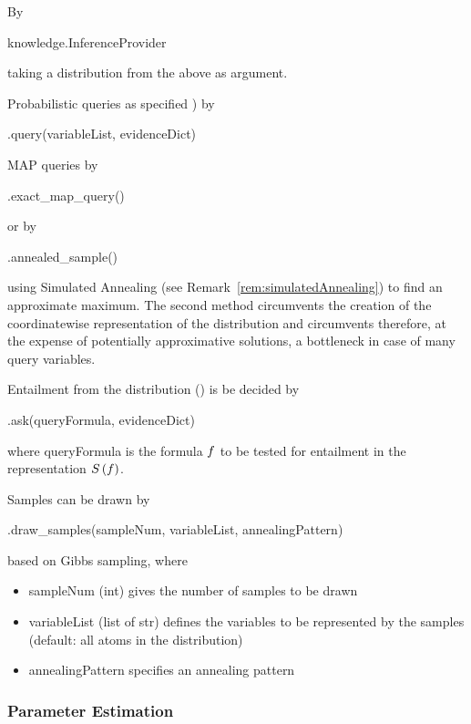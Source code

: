 By
\begin{centeredcode}
	knowledge.InferenceProvider
\end{centeredcode}
taking a distribution from the above as argument.

Probabilistic queries as specified )  by
\begin{centeredcode}
	.query(variableList, evidenceDict)
\end{centeredcode}

MAP queries by
\begin{centeredcode}
	.exact\_map\_query()
\end{centeredcode}
or by
\begin{centeredcode}
	.annealed\_sample()
\end{centeredcode}
using Simulated Annealing (see Remark~\ref{rem:simulatedAnnealing}) to find an approximate maximum.
The second method circumvents the creation of the coordinatewise representation of the distribution and circumvents therefore, at the expense of potentially approximative solutions, a bottleneck in case of many query variables.

Entailment from the distribution () is be decided by
\begin{centeredcode}
	.ask(queryFormula, evidenceDict)
\end{centeredcode}
where queryFormula is the formula $f$ to be tested for entailment in the representation $S\left(f\right)$.

Samples can be drawn by
\begin{centeredcode}
	.draw\_samples(sampleNum, variableList, annealingPattern)
\end{centeredcode}
based on Gibbs sampling, where
\begin{itemize}
	\item sampleNum (int) gives the number of samples to be drawn
	\item variableList (list of str) defines the variables to be represented by the samples (default: all atoms in the distribution)
	\item annealingPattern specifies an annealing pattern 
\end{itemize}


\subsubsection{Parameter Estimation}

